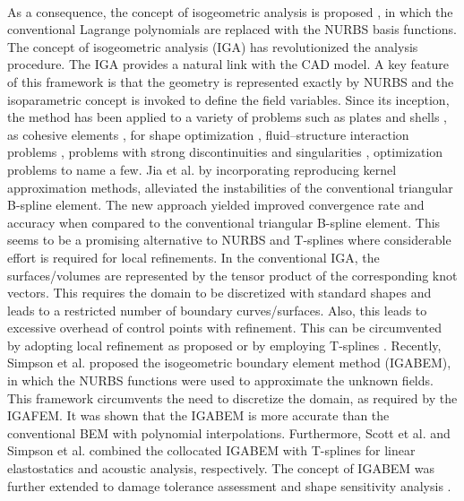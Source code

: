 \paragraph{}
As a consequence, the concept of isogeometric analysis is proposed \citep{Hug2005}, in which the conventional Lagrange polynomials are replaced with the NURBS basis functions.
The concept of isogeometric analysis (IGA) has revolutionized the analysis procedure.
The IGA provides a natural link with the CAD model.
A key feature of this framework is that the geometry is represented exactly by NURBS and the isoparametric concept is invoked to define the field variables.
Since its inception, the method has been applied to a variety of problems such as plates and shells \citep{NGUYENTHANH20113410,NGUYENXUAN2014222,HOSSEINI20141}, as
cohesive elements \citep{NGUYEN2014193}, for shape optimization \citep{WALL20082976}, fluid–structure interaction problems \citep{BAZILEVS201228}, problems with strong discontinuities and singularities \citep{doi:10.1093/imamat/hxu004, doi:10.1002/nme.4580, BAZILEVS201228}, optimization problems \citep{GHASEMI2014463} to name a few.
Jia et al. \citep{JIA2013342} by incorporating reproducing kernel approximation methods, alleviated the instabilities of the conventional triangular B-spline element.
The new approach yielded improved convergence rate and accuracy when compared to the conventional triangular B-spline element.
This seems to be a promising alternative to NURBS and T-splines where considerable effort is required for local refinements. 
In the conventional IGA, the surfaces/volumes are represented by the tensor product of the corresponding knot vectors.
This requires the domain to be discretized with standard shapes and leads to a restricted number of boundary curves/surfaces.
Also, this leads to excessive overhead of control points with refinement.
This can be circumvented by adopting local refinement as proposed \citep{NGUYENTHANH20111892} or by employing T-splines \citep{Sederberg:2003:TT:882262.882295}.
Recently, Simpson et al. \citep{Sim2013, SIMPSON201287} proposed the isogeometric boundary element method (IGABEM), in which the NURBS functions were used to approximate the unknown fields.
This framework circumvents the need to discretize the domain, as required by the IGAFEM.
It was shown that the IGABEM is more accurate than the conventional BEM with polynomial interpolations.
Furthermore, Scott et al. \citep{Sco2013} and Simpson et al. \citep{SIMPSON2014265} combined the collocated IGABEM with T-splines for linear elastostatics and acoustic analysis, respectively.
The concept of IGABEM was further extended to damage tolerance assessment \citep{PengXuan;AtroshchenkoElena;Bordas2014} and shape sensitivity analysis \citep{LianHaojie;SimpsonRobert;Bordas2013}.